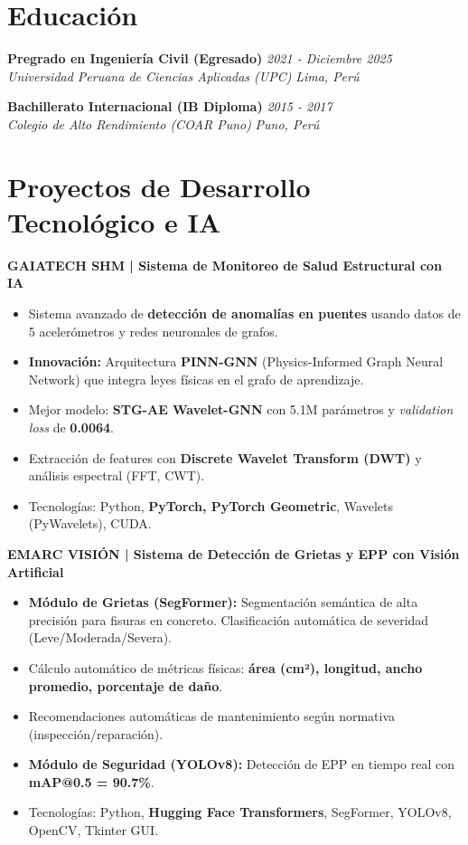 \documentclass[10pt, a4paper]{article}
\newcommand{\entry}[4]{
    \textbf{#1} \hfill \textit{#2} \\
    \textit{#3} \hfill \textit{#4} \\
    \vspace{-1.5mm} 
}
\begin{document}
\vspace{3mm}

\section*{Educación}
\entry{Pregrado en Ingeniería Civil (Egresado)}{2021 - Diciembre 2025}{Universidad Peruana de Ciencias Aplicadas (UPC)}{Lima, Perú}
\vspace{1mm}
\entry{Bachillerato Internacional (IB Diploma)}{2015 - 2017}{Colegio de Alto Rendimiento (COAR Puno)}{Puno, Perú}

\vspace{3mm}

\section*{Proyectos de Desarrollo Tecnológico e IA}

\textbf{GAIATECH SHM | Sistema de Monitoreo de Salud Estructural con IA}
\begin{itemize}
    \item Sistema avanzado de \textbf{detección de anomalías en puentes} usando datos de 5 acelerómetros y redes neuronales de grafos.
    \item \textbf{Innovación:} Arquitectura \textbf{PINN-GNN} (Physics-Informed Graph Neural Network) que integra leyes físicas en el grafo de aprendizaje.
    \item Mejor modelo: \textbf{STG-AE Wavelet-GNN} con 5.1M parámetros y \textit{validation loss} de \textbf{0.0064}.
    \item Extracción de features con \textbf{Discrete Wavelet Transform (DWT)} y análisis espectral (FFT, CWT).
    \item Tecnologías: Python, \textbf{PyTorch, PyTorch Geometric}, Wavelets (PyWavelets), CUDA.
\end{itemize}

\vspace{2mm}

\textbf{EMARC VISIÓN | Sistema de Detección de Grietas y EPP con Visión Artificial}
\begin{itemize}
    \item \textbf{Módulo de Grietas (SegFormer):} Segmentación semántica de alta precisión para fisuras en concreto. Clasificación automática de severidad (Leve/Moderada/Severa).
    \item Cálculo automático de métricas físicas: \textbf{área (cm²), longitud, ancho promedio, porcentaje de daño}.
    \item Recomendaciones automáticas de mantenimiento según normativa (inspección/reparación).
    \item \textbf{Módulo de Seguridad (YOLOv8):} Detección de EPP en tiempo real con \textbf{mAP@0.5 = 90.7\%}.
    \item Tecnologías: Python, \textbf{Hugging Face Transformers}, SegFormer, YOLOv8, OpenCV, Tkinter GUI.
\end{itemize}
\end{document}
